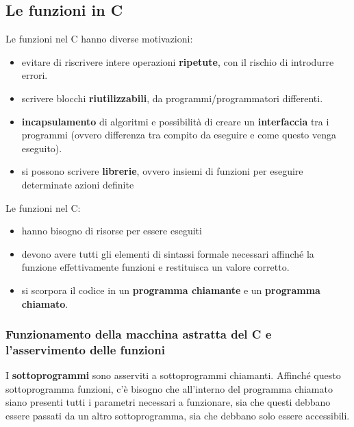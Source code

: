 \documentclass[
  paper=a4,
  oneside  ,captions=tableheading
]{scrbook}
\providecommand{\tightlist}{%
  \setlength{\itemsep}{0pt}\setlength{\parskip}{0pt}}
\begin{document}
\hypertarget{le-funzioni-in-c}{%
\subsection{Le funzioni in C}\label{le-funzioni-in-c}}

Le funzioni nel C hanno diverse motivazioni:

\begin{itemize}
\tightlist
\item
  evitare di riscrivere intere operazioni \textbf{ripetute}, con il
  rischio di introdurre errori.
\item
  scrivere blocchi \textbf{riutilizzabili}, da programmi/programmatori
  differenti.
\item
  \textbf{incapsulamento} di algoritmi e possibilità di creare un
  \textbf{interfaccia} tra i programmi (ovvero differenza tra compito da
  eseguire e come questo venga eseguito).
\item
  si possono scrivere \textbf{librerie}, ovvero insiemi di funzioni per
  eseguire determinate azioni definite
\end{itemize}

Le funzioni nel C:

\begin{itemize}
\tightlist
\item
  hanno bisogno di risorse per essere eseguiti
\item
  devono avere tutti gli elementi di sintassi formale necessari affinché
  la funzione effettivamente funzioni e restituisca un valore corretto.
\item
  si scorpora il codice in un \textbf{programma chiamante} e un
  \textbf{programma chiamato}.
\end{itemize}

\hypertarget{funzionamento-della-macchina-astratta-del-c-e-lasservimento-delle-funzioni}{%
\subsubsection{Funzionamento della macchina astratta del C e
l'asservimento delle
funzioni}\label{funzionamento-della-macchina-astratta-del-c-e-lasservimento-delle-funzioni}}

I \textbf{sottoprogrammi} sono asserviti a sottoprogrammi chiamanti.
Affinché questo sottoprogramma funzioni, c'è bisogno che all'interno del
programma chiamato siano presenti tutti i parametri necessari a
funzionare, sia che questi debbano essere passati da un altro
sottoprogramma, sia che debbano solo essere accessibili.
\end{document}
